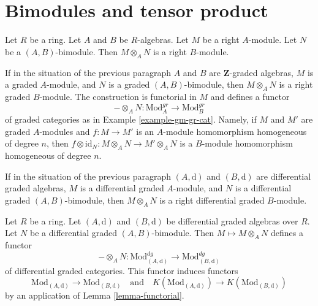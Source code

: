 \section{Bimodules and tensor product}
\label{section-bimodules-tensor}

\noindent
Let $R$ be a ring. Let $A$ and $B$ be $R$-algebras. Let $M$ be a right
$A$-module. Let $N$ be a $(A, B)$-bimodule. Then
$M \otimes_A N$ is a right $B$-module.

\medskip\noindent
If in the situation of the previous paragraph
$A$ and $B$ are $\mathbf{Z}$-graded algebras,
$M$ is a graded $A$-module, and $N$ is a graded $(A, B)$-bimodule,
then $M \otimes_A N$ is a right graded $B$-module. The construction
is functorial in $M$ and defines a functor
$$
- \otimes_A N :
\text{Mod}^{gr}_A
\longrightarrow
\text{Mod}^{gr}_B
$$
of graded categories as in Example \ref{example-gm-gr-cat}. Namely, if
$M$ and $M'$ are graded $A$-modules and $f : M \to M'$ is an $A$-module
homomorphism homogeneous of degree $n$, then
$f \otimes \text{id}_N : M \otimes_A N \to M' \otimes_A N$
is a $B$-module homomorphism homogeneous of degree $n$.

\medskip\noindent
If in the situation of the previous paragraph
$(A, \text{d})$ and $(B, \text{d})$ are differential graded algebras,
$M$ is a differential graded $A$-module, and $N$ is a differential
graded $(A, B)$-bimodule, then $M \otimes_A N$ is a right
differential graded $B$-module.

\begin{lemma}
\label{lemma-tensor}
Let $R$ be a ring. Let $(A, \text{d})$ and $(B, \text{d})$
be differential graded algebras over $R$. Let $N$ be a
differential graded $(A, B)$-bimodule. Then
$M \mapsto M \otimes_A N$ defines a functor
$$
- \otimes_A N :
\text{Mod}^{dg}_{(A, \text{d})}
\longrightarrow
\text{Mod}^{dg}_{(B, \text{d})}
$$
of differential graded categories. This functor induces functors
$$
\text{Mod}_{(A, \text{d})} \to \text{Mod}_{(B, \text{d})}
\quad\text{and}\quad
K(\text{Mod}_{(A, \text{d})}) \to K(\text{Mod}_{(B, \text{d})})
$$
by an application of Lemma \ref{lemma-functorial}.
\end{lemma}

